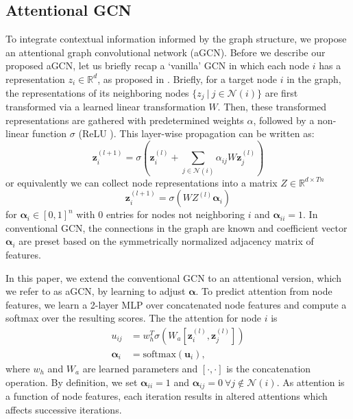 \subsection{Attentional GCN}
\label{sec:agcn}
To integrate contextual information informed by the graph structure, we propose an attentional graph convolutional network (aGCN). Before we describe our proposed aGCN, let us briefly recap a `vanilla' GCN in which each node $i$ has a representation $z_i \in \mathbb{R}^d$, as proposed in \cite{kipf2016semi}. 
Briefly, for a target node $i$ in the graph, the representations of its neighboring nodes $\{z_j ~|~ j \in \mathcal{N}(i)\}$ are first transformed via a learned linear transformation $W$. Then, these transformed representations are gathered with predetermined weights $\alpha$, followed by a non-linear function $\sigma$ 
(ReLU \cite{nair2010rectified}). %
This layer-wise propagation can be written as:
\begin{equation}
\bm{z}_{i}^{(l+1)} = \sigma \left( \bm{z}_i^{(l)} + \sum_{j \in \mathcal{N}(i)} \alpha_{ij} W \bm{z}_{j}^{(l)} \right)
\label{Eq:gcn_orig}
\end{equation}
or equivalently we can collect node representations into a matrix $Z\in\mathbb{R}^{d{\times}Tn}$
\begin{equation}
\bm{z}_{i}^{(l+1)} = \sigma \left( W Z^{(l)} \bm{\alpha}_i \right)
\label{Eq:gcn_orig_sparse}
\end{equation}
for $\bm{\alpha}_i\in [0,1]^{n}$ with 0 entries for nodes not neighboring $i$ and $\bm{\alpha}_{ii}=1$. In conventional GCN, the connections in the graph are known and coefficient vector $\bm{\alpha}_i$ are preset based on the symmetrically normalized adjacency matrix of features.

In this paper, we extend the conventional GCN to an attentional version, which we refer to as aGCN, by learning to adjust $\bm{\alpha}$. To predict attention from node features, we learn a 2-layer MLP over concatenated node features and compute a softmax over the resulting scores. The the attention for node $i$ is
\begin{align}
u_{ij} &= w_{h}^T \sigma(W_{a} [\bm{z}_i^{(l)}, \bm{z}_j^{(l)}])\\
\bm{\alpha}_{i} &= \textrm{softmax}(\bm{u}_{i}), 
\label{Eq:gcn_alpha}
\end{align}
where $w_{h}$ and $W_{a}$ are learned parameters and $[\cdot,\cdot]$ is the concatenation operation. By definition, we set $\bm{\alpha}_{ii}=1$ and $\bm{\alpha}_{ij}=0 ~\forall j \notin \mathcal{N}(i)$. As attention is a function of node features, each iteration results in altered attentions which affects successive iterations.

